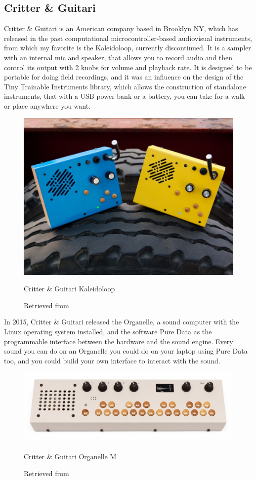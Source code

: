 \subsection{Critter \& Guitari}

Critter \& Guitari is an American company based in Brooklyn NY, which has released in the past computational microcontroller-based audiovisual instruments, from which my favorite is the Kaleidoloop, currently discontinued. It is a sampler with an internal mic and speaker, that allows you to record audio and then control its output with 2 knobs for volume and playback rate. It is designed to be portable for doing field recordings, and it was an influence on the design of the Tiny Trainable Instruments library, which allows the construction of standalone instruments, that with a USB power bank or a battery, you can take for a walk or place anywhere you want.

\begin{figure}[ht]
  \centering
  \includegraphics[width=0.75\linewidth,height=0.25\textheight,keepaspectratio]{images/critter-and-guitari-kaleidoloop.jpg}
  \caption{Critter \& Guitari Kaleidoloop}
  \caption*{Retrieved from \cite{website-critter-and-guitari-kaleidoloop}}
  \label{fig:critter-and-guitari-kaleidoloop}
\end{figure}

In 2015, Critter \& Guitari released the Organelle, a sound computer with the Linux operating system installed, and the software Pure Data as the programmable interface between the hardware and the sound engine. Every sound you can do on an Organelle you could do on your laptop using Pure Data too, and you could build your own interface to interact with the sound.

\begin{figure}[ht]
  \centering
  \includegraphics[width=0.75\linewidth,height=0.25\textheight,keepaspectratio]{images/critter-and-guitari-organelle-m.jpg}
  \caption{Critter \& Guitari Organelle M}
  \caption*{Retrieved from \cite{website-critter-and-guitari-current}}
  \label{fig:critter-and-guitari-organelle-m}
\end{figure}

